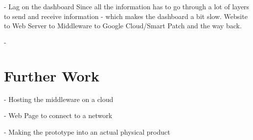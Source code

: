 - Lag on the dashboard 
Since all the information has to go through a lot of layers to send and receive information - which makes the dashboard a bit slow. 
Website to Web Server to Middleware to Google Cloud/Smart Patch and the way back. 

- 





\section{Further Work}

- Hosting the middleware on a cloud

- Web Page to connect to a network

- Making the prototype into an actual physical product
